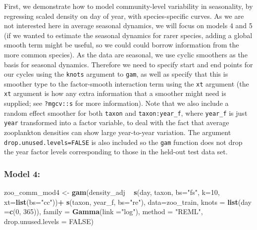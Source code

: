 \documentclass[12pt]{article}
\newenvironment{Shaded}{\begin{snugshade}}{\end{snugshade}}
\newcommand{\KeywordTok}[1]{\textcolor[rgb]{0.13,0.29,0.53}{\textbf{#1}}}
\newcommand{\DataTypeTok}[1]{\textcolor[rgb]{0.13,0.29,0.53}{#1}}
\newcommand{\DecValTok}[1]{\textcolor[rgb]{0.00,0.00,0.81}{#1}}
\newcommand{\StringTok}[1]{\textcolor[rgb]{0.31,0.60,0.02}{#1}}
\newcommand{\OtherTok}[1]{\textcolor[rgb]{0.56,0.35,0.01}{#1}}
\newcommand{\OperatorTok}[1]{\textcolor[rgb]{0.81,0.36,0.00}{\textbf{#1}}}
\newcommand{\NormalTok}[1]{#1}
\begin{document}
First, we demonstrate how to model community-level variability in
seasonality, by regressing scaled density on day of year, with
species-specific curves. As we are not interested here in average
seasonal dynamics, we will focus on models 4 and 5 (if we wanted to
estimate the seasonal dynamics for rarer species, adding a global smooth
term might be useful, so we could could borrow information from the more
common species). As the data are seasonal, we use cyclic smoothers as
the basis for seasonal dynamics. Therefore we need to specify start and
end points for our cycles using the \texttt{knots} argument to
\texttt{gam}, as well as specify that this is smoother type to the
factor-smooth interaction term using the \texttt{xt} argument (the
\texttt{xt} argument is how any extra information that a smoother might
need is supplied; see \texttt{?mgcv::s} for more information). Note that
we also include a random effect smoother for both \texttt{taxon} and
\texttt{taxon:year\_f}, where \texttt{year\_f} is just \texttt{year}
transformed into a factor variable, to deal with the fact that average
zooplankton densities can show large year-to-year variation. The
argument \texttt{drop.unused.levels=FALSE} is also included so the
\texttt{gam} function does not drop the year factor levels corresponding
to those in the held-out test data set.

\subsubsection{Model 4:}\label{model-4-1}

\begin{Shaded}
\begin{Highlighting}[]
\NormalTok{zoo_comm_mod4 <-}\StringTok{ }\KeywordTok{gam}\NormalTok{(density_adj }\OperatorTok{~}\StringTok{ }\KeywordTok{s}\NormalTok{(day, taxon,}
                                     \DataTypeTok{bs=}\StringTok{"fs"}\NormalTok{,}
                                     \DataTypeTok{k=}\DecValTok{10}\NormalTok{,}
                                     \DataTypeTok{xt=}\KeywordTok{list}\NormalTok{(}\DataTypeTok{bs=}\StringTok{"cc"}\NormalTok{))}\OperatorTok{+}
\StringTok{                                   }\KeywordTok{s}\NormalTok{(taxon, year_f, }\DataTypeTok{bs=}\StringTok{"re"}\NormalTok{),}
                     \DataTypeTok{data=}\NormalTok{zoo_train,}
                     \DataTypeTok{knots =} \KeywordTok{list}\NormalTok{(}\DataTypeTok{day =}\KeywordTok{c}\NormalTok{(}\DecValTok{0}\NormalTok{, }\DecValTok{365}\NormalTok{)),}
                     \DataTypeTok{family =} \KeywordTok{Gamma}\NormalTok{(}\DataTypeTok{link =}\StringTok{"log"}\NormalTok{), }
                     \DataTypeTok{method =} \StringTok{"REML"}\NormalTok{,}
                     \DataTypeTok{drop.unused.levels =} \OtherTok{FALSE}\NormalTok{)}
\end{Highlighting}
\end{Shaded}
\end{document}
